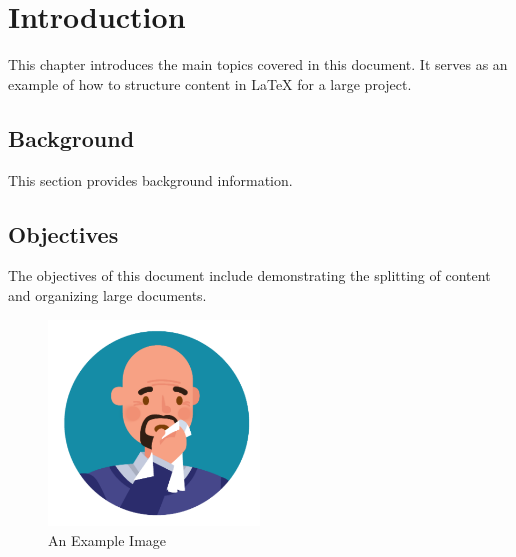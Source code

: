 \chapter{Introduction}
This chapter introduces the main topics covered in this document. It serves as an example of how to structure content in LaTeX for a large project.

\section{Background}
This section provides background information.

\section{Objectives}
The objectives of this document include demonstrating the splitting of content and organizing large documents.

\begin{figure}[h]
    \centering
    \includegraphics[width=0.5\textwidth]{sneeze.png} %
    \caption{An Example Image}
\end{figure}
